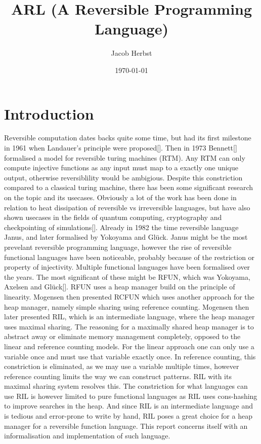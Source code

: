 \documentclass[a4paper]{article}
\author{Jacob Herbst}
\date{\today}
\title{ARL (A Reversible Programming Language)}
\begin{document}
\maketitle

\section{Introduction}
\label{sec:orga00ca27}
Reversible computation dates backs quite some time, but had its first milestone in 1961 when Landauer's principle were proposed\ref{}. Then in 1973 Bennett\ref{} formalised a model for reversible turing machines (RTM). Any RTM can only compute injective functions as any input must map to a exactly one unique output, otherwise reversiblility would be ambigious. Despite this constriction compared to a classical turing machine, there has been some significant research on the topic and its usecases. Obviously a lot of the work has been done in relation to heat dissipation of reversible vs irreversible languages, but have also shown usecases in the fields of quantum computing, cryptography and checkpointing of simulations\ref{}. Already in 1982 the time reversible language Janus, and later formalised by Yokoyama and Glück. Janus might be the most prevelant reversible programming language, however the rise of reversible functional languages have been noticeable, probably because of the restriction or property of injectivity. Multiple functional languages have been formalised over the years. The most significant of these might be RFUN, which was Yokoyama, Axelsen and Glück\ref{}. RFUN uses a heap manager build on the principle of linearity. Mogensen then presented RCFUN which uses another approach for the heap manager, namely simple sharing using reference counting. Mogensen then later presented RIL, which is an intermediate language, where the heap manager uses maximal sharing. The reasoning for a maximally shared heap manager is to abstract away or eliminate memory management completely, opposed to the linear and reference counting models. For the linear approach one can only use a variable once and must use that variable exactly once. In reference counting, this constriction is eliminated, as we may use a variable multiple times, however reference counting limits the way we can construct patterns. RIL with its maximal sharing system resolves this. The constriction for what languages can use RIL is however limited to pure functional languages as RIL uses cons-hashing to improve searches in the heap. And since RIL is an intermediate language and is tedious and error-prone to write by hand, RIL poses a great choice for a heap manager for a reversible function language. This report concerns itself with an informalisation and implementation of such language.
\end{document}
